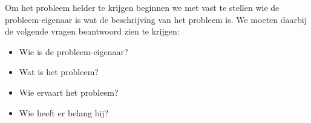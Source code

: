 Om het probleem helder te krijgen beginnen we met vast te stellen wie de probleem-eigenaar is wat de beschrijving van het probleem is. We moeten daarbij de volgende vragen beantwoord zien te krijgen:
\begin{itemize}
\item Wie is de probleem-eigenaar?
\item Wat is het probleem?
\item Wie ervaart het probleem?
\item Wie heeft er belang bij?
\end{itemize}

